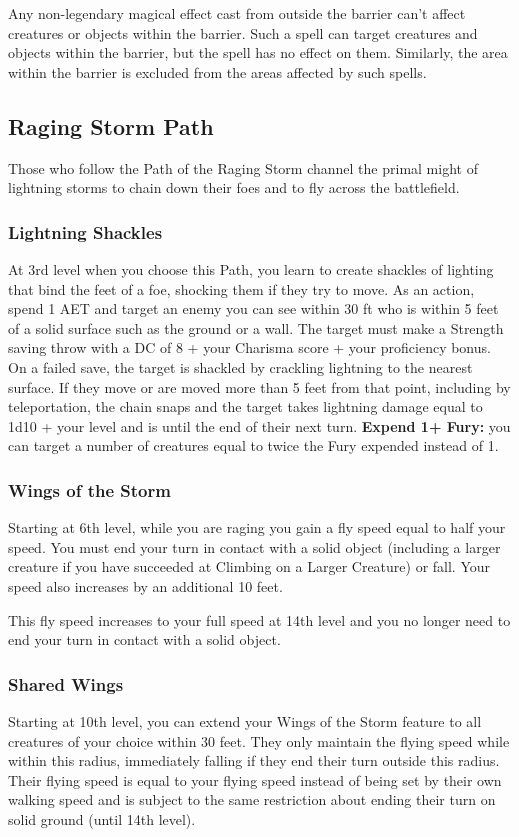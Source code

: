 Any non-legendary magical effect cast from outside the barrier can't affect creatures or objects within the barrier. Such a spell can target creatures and objects within the barrier, but the spell has no effect on them. Similarly, the area within the barrier is excluded from the areas affected by such spells.

\subsection{Raging Storm Path}
Those who follow the Path of the Raging Storm channel the primal might of lightning storms to chain down their foes and to fly across the battlefield.

\subsubsection{Lightning Shackles}
At 3rd level when you choose this Path, you learn to create shackles of lighting that bind the feet of a foe, shocking them if they try to move. As an action, spend 1 AET and target an enemy you can see within 30 ft who is within 5 feet of a solid surface such as the ground or a wall. The target must make a Strength saving throw with a DC of 8 + your Charisma score + your proficiency bonus. On a failed save, the target is shackled by crackling lightning to the nearest surface. If they move or are moved more than 5 feet from that point, including by teleportation, the chain snaps and the target takes lightning damage equal to 1d10 + your level and is  until the end of their next turn. \textbf{Expend 1+ Fury:} you can target a number of creatures equal to twice the Fury expended instead of 1.

\subsubsection{Wings of the Storm}
Starting at 6th level, while you are raging you gain a fly speed equal to half your speed. You must end your turn in contact with a solid object (including a larger creature if you have succeeded at Climbing on a Larger Creature) or fall. Your speed also increases by an additional 10 feet.

This fly speed increases to your full speed at 14th level and you no longer need to end your turn in contact with a solid object.

\subsubsection{Shared Wings}
Starting at 10th level, you can extend your Wings of the Storm feature to all creatures of your choice within 30 feet. They only maintain the flying speed while within this radius, immediately falling if they end their turn outside this radius. Their flying speed is equal to your flying speed instead of being set by their own walking speed and is subject to the same restriction about ending their turn on solid ground (until 14th level).

